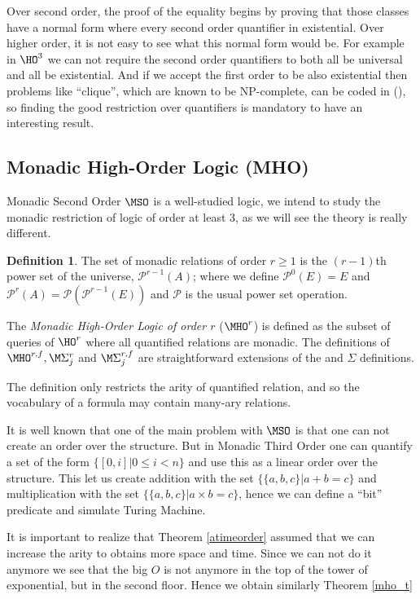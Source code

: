 \documentclass[a4paper,12pt]{article}
\newcommand{\emphdex}[1]{\index{#1}\emph{#1}}
\theoremstyle{definition}
\newtheorem{definition}[theorem]{Definition}
\newcommand{\hoa}[1]{\ensuremath{\HO^{#1}}}
\newcommand{\mhoa}[1]{\ensuremath{\MHO^{#1}}}
\newcommand{\mhob}[2]{\ensuremath{\M\Sigma^{#1}_{#2}}}
\newcommand{\mhod}[2]{\ensuremath{\MHO^{#1,#2}}}
\newcommand{\mhoc}[3]{\ensuremath{\M\Sigma^{#1,#3}_{#2}}}
\newcommand{\mc}{\mathcal}
\begin{document}
Over second order, the proof of the equality begins by proving that
those classes have a normal form where every second order quantifier
in existential. Over higher order, it is not easy to see what this
normal form would be. For example in \hoa{3} we can not require
the second order quantifiers to both all be universal and all be existential. And if we
accept the first order to be also existential then problems like
``clique'', which are known to be NP-complete, can be coded in
\SO(\HORN), so finding the good restriction over quantifiers is
mandatory to have an interesting result.


\subsection{Monadic High-Order Logic (MHO)}
\label{sec:mho}
Monadic Second Order $\MSO$ is a well-studied logic, we intend to
study the monadic restriction of logic of order at least 3, as we will
see the theory is really different.

\begin{definition}
The set of monadic relations of order $r\ge 1$ is the $(r-1)$th
  power set of the universe, $\mc P^{r-1}(A)$; where we define $\mc
  P^{0}(E)=E$ and $\mc P^{r}(A)=\mc P(\mc P^{r-1}(E))$ and $\mc P$ is
  the usual power set operation. 

  The \emphdex{Monadic High-Order Logic of order $r$ } (\mhoa{r}) is
  defined as the subset of queries of $\hoa{r}$ where all quantified
  relations are monadic. The definitions of $\mhod{r}{f},\mhob{r}{j}$
  and $\mhoc{r}{j}{f}$ are straightforward extensions of the \HO{} and
  $\Sigma$ definitions.
\end{definition}
The definition only restricts the arity of quantified relation, and so
the vocabulary of a formula may contain many-ary relations.

It is well known that one of the main problem with $\MSO$ is that one
can not create an order over the structure. But in Monadic Third Order
one can quantify a set of the form $\{[0,i]|0\le i< n\}$ and use this
as a linear order over the structure. This let us create addition with
the set $\{\{a,b,c\}|a+b=c\}$ and multiplication with the set
$\{\{a,b,c\}|a\times b=c\}$, hence we can define a ``bit'' predicate
and simulate Turing Machine. 

It is important to realize that Theorem \ref{atimeorder} assumed that
we can increase the arity to obtains more space and time. Since we can
not do it anymore we see that the big $O$ is not anymore in the top of
the tower of exponential, but in the second floor. Hence we
obtain similarly  Theorem  \ref{mho_t}
\end{document}
